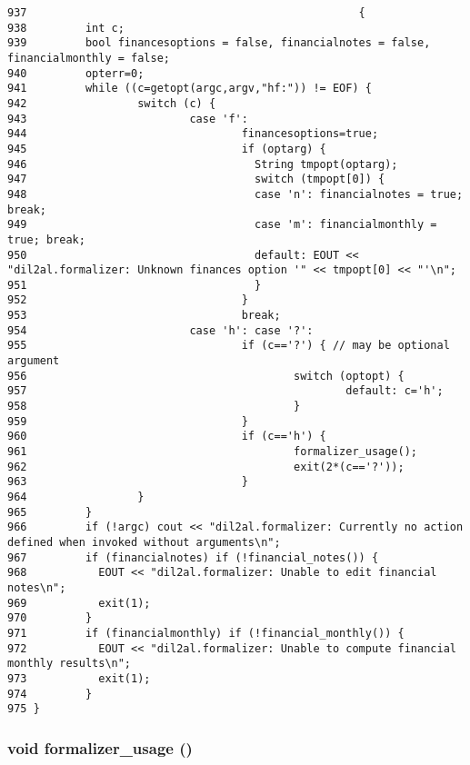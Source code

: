 \footnotesize\begin{verbatim}937                                                   {
938         int c;
939         bool financesoptions = false, financialnotes = false, financialmonthly = false;
940         opterr=0;
941         while ((c=getopt(argc,argv,"hf:")) != EOF) {
942                 switch (c) {
943                         case 'f':
944                                 financesoptions=true;
945                                 if (optarg) {
946                                   String tmpopt(optarg);
947                                   switch (tmpopt[0]) {
948                                   case 'n': financialnotes = true; break;
949                                   case 'm': financialmonthly = true; break;
950                                   default: EOUT << "dil2al.formalizer: Unknown finances option '" << tmpopt[0] << "'\n";
951                                   }
952                                 }
953                                 break;
954                         case 'h': case '?':
955                                 if (c=='?') { // may be optional argument
956                                         switch (optopt) {
957                                                 default: c='h';
958                                         }
959                                 }
960                                 if (c=='h') {
961                                         formalizer_usage();
962                                         exit(2*(c=='?'));
963                                 }
964                 }
965         }
966         if (!argc) cout << "dil2al.formalizer: Currently no action defined when invoked without arguments\n";
967         if (financialnotes) if (!financial_notes()) {
968           EOUT << "dil2al.formalizer: Unable to edit financial notes\n";
969           exit(1);
970         }
971         if (financialmonthly) if (!financial_monthly()) {
972           EOUT << "dil2al.formalizer: Unable to compute financial monthly results\n";
973           exit(1);
974         }
975 }
\end{verbatim}\normalsize 
{}
\subsubsection{\setlength{\rightskip}{0pt plus 5cm}void formalizer\_\-usage ()}\label{dil2al_8cc_a112}




